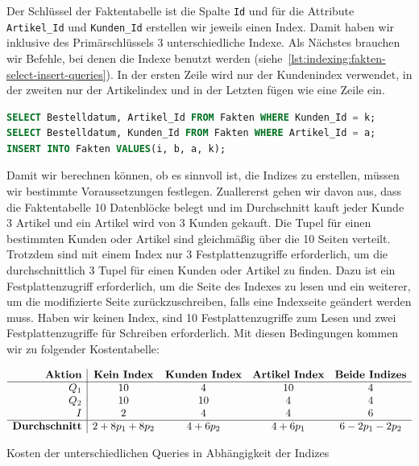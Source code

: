 Der Schlüssel der Faktentabelle ist die Spalte \texttt{Id} und für die Attribute \texttt{Artikel\_Id} und \texttt{Kunden\_Id} erstellen wir jeweils einen Index.
Damit haben wir inklusive des Primärschlüssels 3 unterschiedliche Indexe.
Als Nächstes brauchen wir Befehle, bei denen die Indexe benutzt werden (siehe~\ref{lst:indexing:fakten-select-insert-queries}).
In der ersten Zeile wird nur der Kundenindex verwendet, in der zweiten nur der Artikelindex und in der Letzten fügen wie eine Zeile ein.

\vspace{-12pt}
\begin{lstlisting}[language=SQL,caption=Select-Queries für die Faktentabelle,label={lst:indexing:fakten-select-insert-queries}]
SELECT Bestelldatum, Artikel_Id FROM Fakten WHERE Kunden_Id = k;
SELECT Bestelldatum, Kunden_Id FROM Fakten WHERE Artikel_Id = a;
INSERT INTO Fakten VALUES(i, b, a, k);
\end{lstlisting}
\vspace{-8pt}

Damit wir berechnen können, ob es sinnvoll ist, die Indizes zu erstellen, müssen wir bestimmte Voraussetzungen festlegen.
Zuallererst gehen wir davon aus, dass die Faktentabelle 10 Datenblöcke belegt und im Durchschnitt kauft jeder Kunde 3 Artikel und ein Artikel wird von 3 Kunden gekauft.
Die Tupel für einen bestimmten Kunden oder Artikel sind gleichmäßig über die 10 Seiten verteilt.
Trotzdem sind mit einem Index nur 3 Festplattenzugriffe erforderlich, um die durchschnittlich 3 Tupel für einen Kunden oder Artikel zu finden.
Dazu ist ein Festplattenzugriff erforderlich, um die Seite des Indexes zu lesen und ein weiterer, um die modifizierte Seite zurückzuschreiben, falls eine Indexseite geändert werden muss.
Haben wir keinen Index, sind 10 Festplattenzugriffe zum Lesen und zwei Festplattenzugriffe für Schreiben erforderlich.
Mit diesen Bedingungen kommen wir zu folgender Kostentabelle:

\vspace{-18pt}
\begin{table}[H]
    \centering
    \setlength{\arrayrulewidth}{0.4mm}
    \[
        \begin{array}{r|c c c c}
            \textbf{Aktion} & \textbf{Kein Index} & \textbf{Kunden Index} & \textbf{Artikel Index} & \textbf{Beide Indizes} \\ \hline
            Q_1 & 10 & 4 & 10 & 4 \\
            Q_2 & 10 & 10 & 4 & 4 \\
            I   & 2  & 4  & 4  & 6 \\ \hline
            \textbf{Durchschnitt} & 2 + 8p_1 + 8p_2 & 4 + 6p_2 & 4 + 6p_1 & 6-2p_1-2p_2 \\
        \end{array}
    \]
    \vspace{-5pt}
    \caption[Performance-Vergleich]{Kosten der unterschiedlichen Queries in Abhängigkeit der Indizes}
    \label{tab:performance-queries}
\end{table}
\vspace{-25pt}

